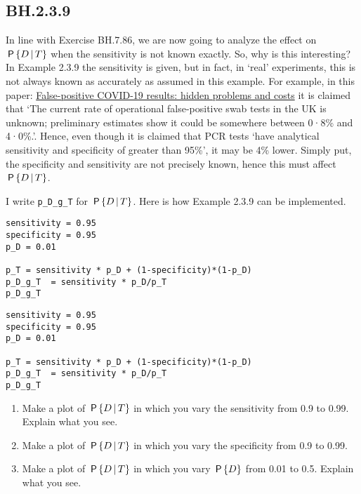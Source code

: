 \subsection{BH.2.3.9}

In line with Exercise BH.7.86, we are now going to analyze the effect on \(\P{D\given T}\) when the sensitivity is not known exactly.
So, why is this interesting?
In Example 2.3.9 the sensitivity is given, but in fact, in `real' experiments, this is not always known as accurately as assumed in this example.
For example, in this paper: \href{https://www.thelancet.com/journals/lanres/article/PIIS2213-2600(20)30453-7/fulltext}{False-positive COVID-19 results: hidden problems and costs} it is claimed that `The current rate of operational false-positive swab tests in the UK is unknown; preliminary estimates show it could be somewhere between 0·8\% and 4·0\%.'.
Hence, even though it is claimed that PCR tests `have analytical sensitivity and specificity of greater than 95\%', it may be 4\% lower.
Simply put, the specificity and sensitivity are not precisely known, hence this must affect \(\P{D\given T}\).





I write \texttt{p\_D\_g\_T} for \(\P{D\given T}\). Here is how  Example 2.3.9 can be implemented.

\begin{verbatim}
sensitivity = 0.95
specificity = 0.95
p_D = 0.01

p_T = sensitivity * p_D + (1-specificity)*(1-p_D)
p_D_g_T  = sensitivity * p_D/p_T
p_D_g_T
\end{verbatim}

\begin{verbatim}
sensitivity = 0.95
specificity = 0.95
p_D = 0.01

p_T = sensitivity * p_D + (1-specificity)*(1-p_D)
p_D_g_T  = sensitivity * p_D/p_T
p_D_g_T
\end{verbatim}


\begin{exercise}
\begin{enumerate}
\item Make a plot of \(\P{D\given T}\) in which you vary the sensitivity from 0.9 to 0.99. Explain what you see.
\item Make a plot of \(\P{D\given T}\) in which you vary the specificity from 0.9 to 0.99.
\item Make a plot of \(\P{D\given T}\) in which you vary \(\P{D}\) from 0.01 to 0.5. Explain what you see.
\end{enumerate}
\end{exercise}
